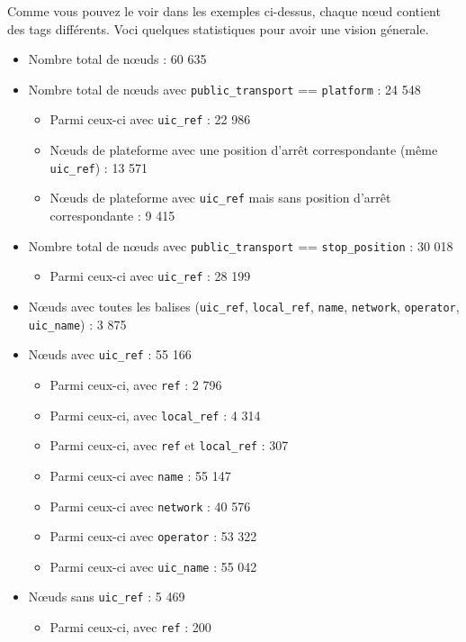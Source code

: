 Comme vous pouvez le voir dans les exemples ci-dessus, chaque nœud contient des tags différents. Voci quelques statistiques pour avoir une vision génerale. 
\begin{itemize}
    \item Nombre total de nœuds : 60 635
    \item Nombre total de nœuds avec \texttt{public\_transport} == \texttt{platform} : 24 548
    \begin{itemize}
        \item Parmi ceux-ci avec \texttt{uic\_ref} : 22 986
        \item Nœuds de plateforme avec une position d'arrêt correspondante (même \texttt{uic\_ref}) : 13 571
        \item Nœuds de plateforme avec \texttt{uic\_ref} mais sans position d'arrêt correspondante : 9 415
    \end{itemize}
    \item Nombre total de nœuds avec \texttt{public\_transport} == \texttt{stop\_position} : 30 018
    \begin{itemize}
        \item Parmi ceux-ci avec \texttt{uic\_ref} : 28 199
    \end{itemize}
    \item Nœuds avec toutes les balises (\texttt{uic\_ref}, \texttt{local\_ref}, \texttt{name}, \texttt{network}, \texttt{operator}, \texttt{uic\_name}) : 3 875
    \item Nœuds avec \texttt{uic\_ref} : 55 166
    \begin{itemize}
        \item Parmi ceux-ci, avec \texttt{ref} : 2 796
        \item Parmi ceux-ci, avec \texttt{local\_ref} : 4 314
        \item Parmi ceux-ci, avec \texttt{ref} et \texttt{local\_ref} : 307
        \item Parmi ceux-ci avec \texttt{name} : 55 147
        \item Parmi ceux-ci avec \texttt{network} : 40 576
        \item Parmi ceux-ci avec \texttt{operator} : 53 322
        \item Parmi ceux-ci avec \texttt{uic\_name} : 55 042
    \end{itemize}
    \item Nœuds sans \texttt{uic\_ref} : 5 469
    \begin{itemize}
        \item Parmi ceux-ci, avec \texttt{ref} : 200

\end{itemize}
\end{itemize}
